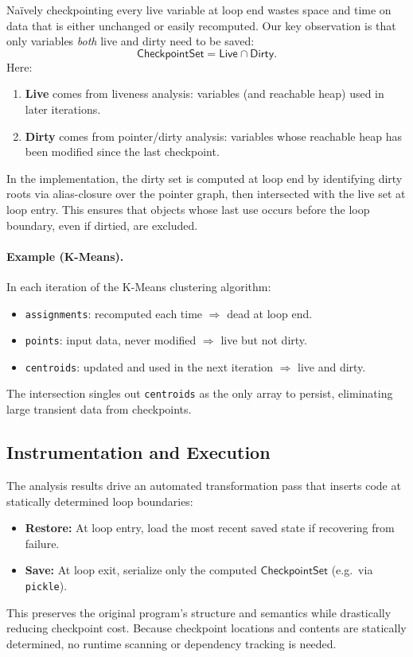 Naïvely checkpointing every live variable at loop end wastes space and time on data that is either unchanged or easily recomputed. Our key observation is that only variables \emph{both} live and dirty need to be saved:
\[
\mathsf{CheckpointSet} = \mathsf{Live} \cap \mathsf{Dirty}.
\]
Here:
\begin{enumerate}
    \item \textbf{Live} comes from liveness analysis: variables (and reachable heap) used in later iterations.
    \item \textbf{Dirty} comes from pointer/dirty analysis: variables whose reachable heap has been modified since the last checkpoint.
\end{enumerate}
In the implementation, the dirty set is computed at loop end by identifying dirty roots via alias-closure over the pointer graph, then intersected with the live set at loop entry. This ensures that objects whose last use occurs before the loop boundary, even if dirtied, are excluded.

\paragraph{Example (K-Means).}
In each iteration of the K-Means clustering algorithm:
\begin{itemize}
    \item \texttt{assignments}: recomputed each time $\Rightarrow$ dead at loop end.
    \item \texttt{points}: input data, never modified $\Rightarrow$ live but not dirty.
    \item \texttt{centroids}: updated and used in the next iteration $\Rightarrow$ live and dirty.
\end{itemize}
The intersection singles out \texttt{centroids} as the only array to persist, eliminating large transient data from checkpoints.

\subsection{Instrumentation and Execution}

The analysis results drive an automated transformation pass that inserts code at statically determined loop boundaries:
\begin{itemize}
    \item \textbf{Restore:} At loop entry, load the most recent saved state if recovering from failure.
    \item \textbf{Save:} At loop exit, serialize only the computed $\mathsf{CheckpointSet}$ (e.g.\ via \texttt{pickle}).
\end{itemize}
This preserves the original program’s structure and semantics while drastically reducing checkpoint cost. Because checkpoint locations and contents are statically determined, no runtime scanning or dependency tracking is needed.
